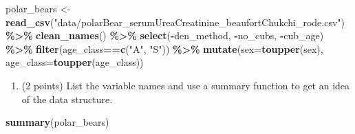 \documentclass[
]{article}
\newenvironment{Shaded}{\begin{snugshade}}{\end{snugshade}}
\newcommand{\AttributeTok}[1]{\textcolor[rgb]{0.13,0.29,0.53}{#1}}
\newcommand{\FunctionTok}[1]{\textcolor[rgb]{0.13,0.29,0.53}{\textbf{#1}}}
\newcommand{\NormalTok}[1]{#1}
\newcommand{\OtherTok}[1]{\textcolor[rgb]{0.56,0.35,0.01}{#1}}
\newcommand{\SpecialCharTok}[1]{\textcolor[rgb]{0.81,0.36,0.00}{\textbf{#1}}}
\newcommand{\StringTok}[1]{\textcolor[rgb]{0.31,0.60,0.02}{#1}}
\providecommand{\tightlist}{%
  \setlength{\itemsep}{0pt}\setlength{\parskip}{0pt}}
\begin{document}
\begin{Shaded}
\begin{Highlighting}[]
\NormalTok{polar\_bears }\OtherTok{\textless{}{-}} 
  \FunctionTok{read\_csv}\NormalTok{(}\StringTok{"data/polarBear\_serumUreaCreatinine\_beaufortChukchi\_rode.csv"}\NormalTok{) }\SpecialCharTok{\%\textgreater{}\%} 
  \FunctionTok{clean\_names}\NormalTok{() }\SpecialCharTok{\%\textgreater{}\%} 
  \FunctionTok{select}\NormalTok{(}\SpecialCharTok{{-}}\NormalTok{den\_method, }\SpecialCharTok{{-}}\NormalTok{no\_cubs, }\SpecialCharTok{{-}}\NormalTok{cub\_age) }\SpecialCharTok{\%\textgreater{}\%}
  \FunctionTok{filter}\NormalTok{(age\_class}\SpecialCharTok{==}\FunctionTok{c}\NormalTok{(}\StringTok{"A"}\NormalTok{, }\StringTok{"S"}\NormalTok{)) }\SpecialCharTok{\%\textgreater{}\%} 
  \FunctionTok{mutate}\NormalTok{(}\AttributeTok{sex=}\FunctionTok{toupper}\NormalTok{(sex), }
         \AttributeTok{age\_class=}\FunctionTok{toupper}\NormalTok{(age\_class))}
\end{Highlighting}
\end{Shaded}

\begin{enumerate}
\def\labelenumi{\arabic{enumi}.}
\tightlist
\item
  (2 points) List the variable names and use a summary function to get
  an idea of the data structure.
\end{enumerate}

\begin{Shaded}
\begin{Highlighting}[]
\FunctionTok{summary}\NormalTok{(polar\_bears)}
\end{Highlighting}
\end{Shaded}
\end{document}
